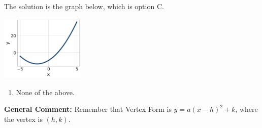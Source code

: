 \documentclass{extbook}[14pt]
\begin{document}
\begin{enumerate}
{The solution is the graph below, which is option C.
\begin{center}
    \includegraphics[width=0.3\textwidth]{../Figures/quadraticEquationToGraphCC.png}
\end{center}\begin{enumerate}[label=\Alph*.]
\item None of the above.\end{enumerate}
\textbf{General Comment:} Remember that Vertex Form is $y = a(x-h)^2+k$, where the vertex is $(h, k)$.
}
\end{enumerate}
\end{document}
